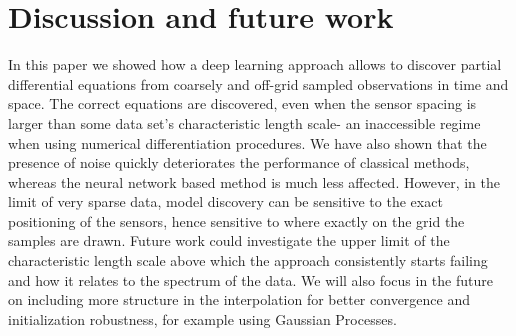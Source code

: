 \documentclass{article} %
\begin{document}
\section{Discussion and future work}
In this paper we showed how a deep learning approach allows to discover partial differential equations from coarsely and off-grid sampled observations in time and space. The correct equations are discovered, even when the sensor spacing is larger than some data set’s characteristic length scale- an inaccessible regime when using numerical differentiation procedures. We have also shown that the presence of noise quickly deteriorates the performance of classical methods, whereas the neural network based method is much less affected. However, in the limit of very sparse data, model discovery can be sensitive to the exact positioning of the sensors, hence sensitive to where exactly on the grid the samples are drawn. Future work could investigate the upper limit of the characteristic length scale above which the approach consistently starts failing and how it relates to the spectrum of the data. We will also focus in the future on including more structure in the interpolation for better convergence and initialization robustness, for example using Gaussian Processes.
 
\end{document}
